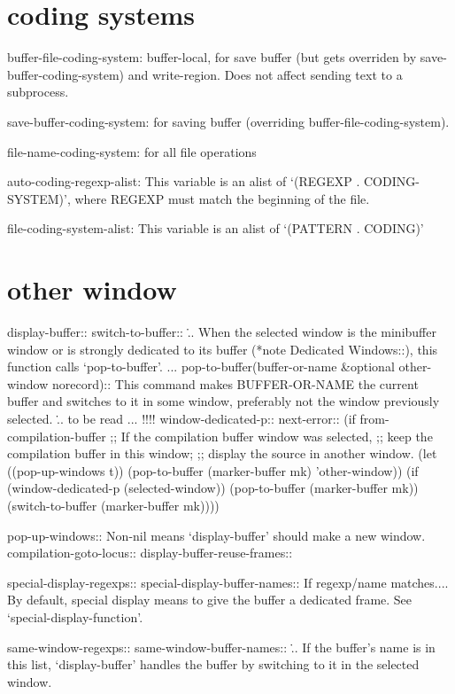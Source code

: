 \documentclass[a4paper]{report}
\begin{document}
\section{coding systems}

buffer-file-coding-system: buffer-local, for save buffer (but gets overriden
by save-buffer-coding-system) and write-region. Does not affect sending text
to a subprocess.

save-buffer-coding-system: for saving buffer (overriding
buffer-file-coding-system).

file-name-coding-system: for all file operations

auto-coding-regexp-alist: This variable is an alist of `(REGEXP
. CODING-SYSTEM)', where REGEXP must match the beginning of the file.

file-coding-system-alist: This variable is an alist of `(PATTERN . CODING)'

\section{other window}

display-buffer::
switch-to-buffer::
\... When the selected window is the minibuffer window or is strongly
dedicated to its buffer (*note Dedicated Windows::), this function calls
`pop-to-buffer'. ...
pop-to-buffer(buffer-or-name &optional other-window norecord)::
This command makes BUFFER-OR-NAME the current buffer and switches
to it in some window, preferably not the window previously
selected. 
\... to be read ... !!!!
window-dedicated-p::
next-error::
(if from-compilation-buffer
        ;; If the compilation buffer window was selected,
        ;; keep the compilation buffer in this window;
        ;; display the source in another window.
        (let ((pop-up-windows t))
          (pop-to-buffer (marker-buffer mk) 'other-window))
      (if (window-dedicated-p (selected-window))
          (pop-to-buffer (marker-buffer mk))
        (switch-to-buffer (marker-buffer mk))))




pop-up-windows::
  Non-nil means `display-buffer' should make a new window.
compilation-goto-locus::
display-buffer-reuse-frames::

special-display-regexps::
special-display-buffer-names::
If regexp/name matches.... By default, special display means to give the
buffer a dedicated frame. See `special-display-function'.

same-window-regexps::
same-window-buffer-names::
\... If the buffer's name is in this list, `display-buffer' handles the buffer by
switching to it in the selected window.
\end{document}
